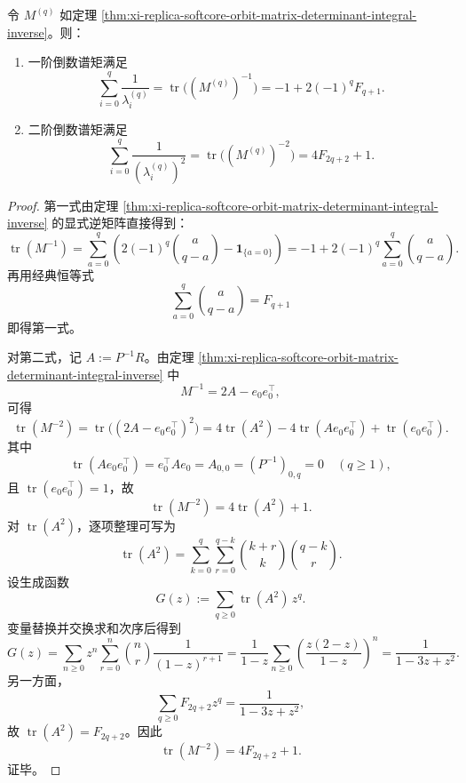 \begin{corollary}\label{cor:xi-replica-softcore-exceptional-reciprocal-moments-fibonacci-unified}
令 \(M^{(q)}\) 如定理 \ref{thm:xi-replica-softcore-orbit-matrix-determinant-integral-inverse}。则：
\begin{enumerate}
  \item 一阶倒数谱矩满足
  \[
  \sum_{i=0}^{q}\frac1{\lambda_i^{(q)}}
  =\operatorname{tr}\!\bigl((M^{(q)})^{-1}\bigr)
  =-1+2(-1)^qF_{q+1}.
  \]
  \item 二阶倒数谱矩满足
  \[
  \sum_{i=0}^{q}\frac1{(\lambda_i^{(q)})^2}
  =\operatorname{tr}\!\bigl((M^{(q)})^{-2}\bigr)
  =4F_{2q+2}+1.
  \]
\end{enumerate}
\end{corollary}
\begin{proof}
第一式由定理 \ref{thm:xi-replica-softcore-orbit-matrix-determinant-integral-inverse} 的显式逆矩阵直接得到：
\[
\operatorname{tr}(M^{-1})
=\sum_{a=0}^{q}\left(2(-1)^q\binom{a}{q-a}-\mathbf{1}_{\{a=0\}}\right)
=-1+2(-1)^q\sum_{a=0}^{q}\binom{a}{q-a}.
\]
再用经典恒等式
\[
\sum_{a=0}^{q}\binom{a}{q-a}=F_{q+1}
\]
即得第一式。

对第二式，记 \(A:=P^{-1}R\)。由定理 \ref{thm:xi-replica-softcore-orbit-matrix-determinant-integral-inverse} 中
\[
M^{-1}=2A-e_0e_0^\top,
\]
可得
\[
\operatorname{tr}(M^{-2})
=\operatorname{tr}\!\bigl((2A-e_0e_0^\top)^2\bigr)
=4\operatorname{tr}(A^2)-4\operatorname{tr}(Ae_0e_0^\top)+\operatorname{tr}(e_0e_0^\top).
\]
其中
\[
\operatorname{tr}(Ae_0e_0^\top)=e_0^\top A e_0=A_{0,0}=(P^{-1})_{0,q}=0\quad(q\ge 1),
\]
且 \(\operatorname{tr}(e_0e_0^\top)=1\)，故
\[
\operatorname{tr}(M^{-2})=4\operatorname{tr}(A^2)+1.
\]
对 \(\operatorname{tr}(A^2)\)，逐项整理可写为
\[
\operatorname{tr}(A^2)=\sum_{k=0}^{q}\sum_{r=0}^{q-k}\binom{k+r}{k}\binom{q-k}{r}.
\]
设生成函数
\[
G(z):=\sum_{q\ge 0}\operatorname{tr}(A^2)\,z^q.
\]
变量替换并交换求和次序后得到
\[
G(z)
=\sum_{n\ge 0}z^n\sum_{r=0}^{n}\binom{n}{r}\frac1{(1-z)^{r+1}}
=\frac1{1-z}\sum_{n\ge 0}\left(\frac{z(2-z)}{1-z}\right)^n
=\frac1{1-3z+z^2}.
\]
另一方面，
\[
\sum_{q\ge 0}F_{2q+2}z^q=\frac1{1-3z+z^2},
\]
故 \(\operatorname{tr}(A^2)=F_{2q+2}\)。因此
\[
\operatorname{tr}(M^{-2})=4F_{2q+2}+1.
\]
证毕。
\end{proof}

\endinput
